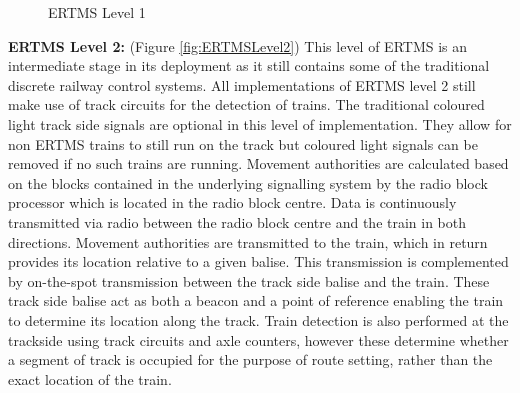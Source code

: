 \begin{center}
\begin{figure}[h!]



 \caption{ERTMS Level 1}
\label{fig:ERTMSLevel1}
\end{figure}
\end{center}

\textbf{ERTMS Level 2:}  (Figure \ref{fig:ERTMSLevel2}) This level of ERTMS is an intermediate stage in its deployment as it still contains some of the traditional discrete railway control systems. All implementations of ERTMS level 2 still make use of track circuits for the detection of trains. The traditional coloured light track side signals are optional in this level of implementation. They allow for non ERTMS trains to still run on the  track but coloured light signals can be removed if no such trains are running. Movement authorities are calculated based on the blocks contained in the underlying signalling system by the radio block processor which is located in the radio block centre. Data is continuously transmitted via radio between the radio block centre and the train in both directions. Movement authorities are transmitted to the train, which in return provides its location relative to a given balise. This transmission is complemented by on-the-spot transmission between the track side balise and the train. These track side balise act as both a beacon and a point of reference enabling the train to determine its location along the track. Train detection is also performed at the trackside using track circuits and axle counters, however these determine whether a segment of track is occupied for the purpose of route setting, rather than the exact location of the train. 



